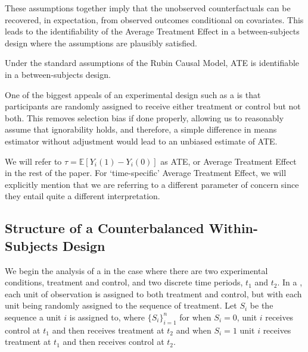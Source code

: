 These assumptions together imply that the unobserved counterfactuals can be recovered, in expectation, from observed outcomes conditional on covariates. This leads to the identifiability of the Average Treatment Effect in a between-subjects design where the assumptions are plausibly satisfied.

\begin{theorem}
\label{theorem: identify_bsd}
    Under the standard assumptions of the Rubin Causal Model, ATE is identifiable in a between-subjects design.
\end{theorem}

One of the biggest appeals of an experimental design such as a \bsd{} is that participants are randomly assigned to receive either treatment or control but not both. This removes selection bias if done properly, allowing us to reasonably assume that ignorability holds, and therefore, a simple difference in means estimator without adjustment would lead to an unbiased estimate of ATE.

\begin{remark}
    We will refer to $\tau = \mathbb{E}[Y_i(1) - Y_i(0)]$ as ATE, or Average Treatment Effect in the rest of the paper. For `time-specific' Average Treatment Effect, we will explicitly mention that we are referring to a different parameter of concern since they entail quite a different interpretation.
\end{remark}

\subsection{Structure of a Counterbalanced Within-Subjects Design}
\label{sec: assumption_cwsd}

We begin the analysis of a \cwsd{} in the case where there are two experimental conditions, treatment and control, and two discrete time periods, $t_1$ and $t_2$. In a \cwsd{}, each unit of observation is assigned to both treatment and control, but with each unit being randomly assigned to the sequence of treatment. Let $S_i$ be the sequence a unit $i$ is assigned to, where $\{S_i\}^n_{i=1}$ for when $S_i = 0$, unit $i$ receives control at $t_1$ and then receives treatment at $t_2$ and when $S_i=1$ unit $i$ receives treatment at $t_1$ and then receives control at $t_2$.

